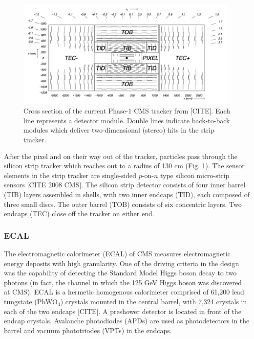 \documentclass{article}
\begin{document}
\begin{figure}[ht]
    \centering
    \includegraphics[width=11cm]{figures/phase-1-tdr-tracker-schematic.png}
    \caption{Cross section of the current Phase-1 CMS tracker from [CITE]. Each line represents a detector module. Double lines indicate back-to-back modules which deliver two-dimensional (stereo) hits in the strip tracker.}
    \label{fig:phase-1-tdr-tracker-schematic}
\end{figure}



After the pixel and on their way out of the tracker, particles pass through the silicon strip tracker which reaches out to a radius of 130 cm (Fig. \ref{fig:phase-1-tdr-tracker-schematic}). The sensor elements in the strip tracker are single-sided $p$-on-$n$ type silicon micro-strip sensors [CITE 2008 CMS]. The silicon strip detector consists of four inner barrel (TIB) layers assembled in shells, with two inner endcaps (TID), each composed of three small discs. The outer barrel (TOB) consists of six concentric layers. Two endcaps (TEC) close off the tracker on either end. 


\subsubsection{ECAL} 
The electromagnetic calorimeter (ECAL) of CMS measures electromagnetic energy deposits with high granularity. One of the driving criteria in the design was the capability of detecting the Standard Model Higgs boson decay to two photons (in fact, the channel in which the 125 GeV Higgs boson was discovered at CMS). %
ECAL is a hermetic homogenous calorimeter comprised of 61,200 lead tungstate (PbWO$_4$) crystals mounted in the central barrel, with 7,324 crystals in each of the two endcaps [CITE]. A preshower detector is located in front of the endcap crystals. Avalanche photodiodes (APDs) are used as photodetectors in the barrel and vacuum phototriodes (VPTs) in the endcaps. 
\end{document}
